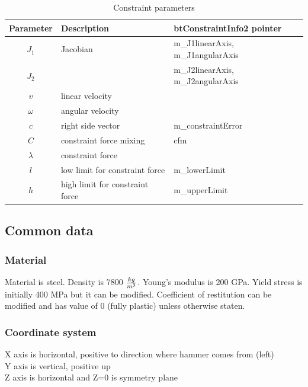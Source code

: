 \begin {table}[htb!]
\begin{center}
\begin{tabular}{|c| l| l|}
\hline
{\bf Parameter} & {\bf Description} & {\bf btConstraintInfo2 pointer}\\  \hline
$J_1$ & Jacobian & m\_J1linearAxis, m\_J1angularAxis \\ 
$J_2$ & & m\_J2linearAxis, m\_J2angularAxis \\ \hline
$v$ & linear velocity & \\ \hline
$\omega$ & angular velocity & \\ \hline
$c$        &  right side vector   & m\_constraintError \\ \hline
$C$  & constraint force mixing & cfm \\  \hline
$\lambda$ & constraint force &  \\ \hline
$l$ & low limit for constraint force & m\_lowerLimit \\ \hline
$h$ & high limit for constraint force & m\_upperLimit \\ \hline
\end {tabular}
\end{center}
\caption {Constraint parameters} \label{tab:constraintParameters} 
\end {table}

\subsection{Common data}

\subsubsection{Material}

Material is steel. Density is 7800 $kg\over{m^{3}}$. Young’s modulus is 200 GPa. Yield stress is initially 400 MPa but it can be modified.
Coefficient of restitution can be modified and has value of 0 (fully plastic) unless otherwise staten.

\subsubsection{Coordinate system}

X axis is horizontal, positive to direction where hammer comes from (left)\\
Y axis is vertical, positive up\\
Z axis is horizontal and Z=0 is symmetry plane

